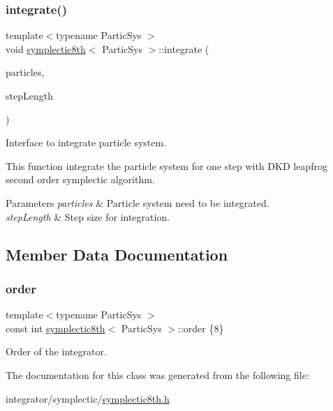\subsubsection{\texorpdfstring{integrate()}{integrate()}}
{\footnotesize\ttfamily template$<$typename Partic\+Sys $>$ \\
void \mbox{\hyperlink{classsymplectic8th}{symplectic8th}}$<$ Partic\+Sys $>$\+::integrate (\begin{DoxyParamCaption}\item[{Partic\+Sys \&}]{particles,  }\item[{\mbox{\hyperlink{classsymplectic8th_a3a85c2b58a75f2da56a6989a73a001b8}{Scalar}}}]{step\+Length }\end{DoxyParamCaption})}



Interface to integrate particle system. 

This function integrate the particle system for one step with D\+KD leapfrog second order symplectic algorithm. 
\begin{DoxyParams}{Parameters}
{\em particles} & Particle system need to be integrated. \\
\hline
{\em step\+Length} & Step size for integration. \\
\hline
\end{DoxyParams}


\subsection{Member Data Documentation}
\mbox{\label{classsymplectic8th_a5f80ae81362e3542cb9ed7653f1b20d6}} 
\subsubsection{\texorpdfstring{order}{order}}
{\footnotesize\ttfamily template$<$typename Partic\+Sys $>$ \\
const int \mbox{\hyperlink{classsymplectic8th}{symplectic8th}}$<$ Partic\+Sys $>$\+::order \{8\}\hspace{0.3cm}{\ttfamily [static]}}



Order of the integrator. 



The documentation for this class was generated from the following file\+:\begin{DoxyCompactItemize}
\item 
integrator/symplectic/\mbox{\hyperlink{symplectic8th_8h}{symplectic8th.\+h}}\end{DoxyCompactItemize}
